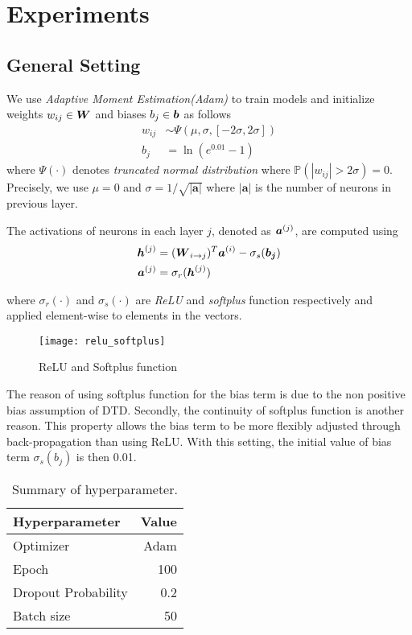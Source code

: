 \chapter{Experiments}
\label{cha:chapter4}


\section{General Setting}\label{sec:setup}
 
 We use \textit{Adaptive Moment Estimation(Adam)}\cite{KingmaAdamMethodStochastic2014} to train models and initialize weights $w_{ij} \in \patmatrix{W}$ and biases $b_{j} \in \patvector{b}$ as follows
\begin{align*}
	w_{ij} &\sim \Psi( \mu, \sigma, [-2\sigma, 2\sigma]) \\
	b_{j} &= \ln(e^{0.01} - 1)
\end{align*}
where $\Psi(\cdot)$ denotes \textit{truncated normal distribution} where $\mathbb{P}(|w_{ij}| > 2\sigma) = 0$. Precisely, we use $\mu=0$ and $\sigma = 1/\sqrt{|\boldsymbol{a}|}$ where $|\boldsymbol{a}|$ is the number of neurons in previous layer.

The activations of neurons in each layer $j$, denoted as $\patvector{a}^{(j)}$, are computed using 
\begin{align*}
\patvector{h}^{(j)}  &=  	(\patmatrix{W}_{ i \rightarrow j })^T \patvector{a}^{(i)} - \sigma_{s}(\patvector{b_j}) \\
	\patvector{a}^{(j)}  &=  	\sigma_{r} (	\patvector{h}^{(j)} )
\end{align*}

where $\sigma_r(\cdot)$ and $\sigma_s(\cdot)$ are \textit{ReLU} and \textit{softplus} function respectively and applied element-wise to elements in the vectors.

 \begin{figure}[!hbt]
\centering
\texttt{[image: relu\_softplus]}
\caption{ReLU and Softplus function} 
\label{fig:relu_softplus}
\end{figure}


The reason of using softplus function for the bias term is due to the non positive bias assumption of DTD. Secondly, the continuity of softplus function is another reason. This property allows the bias term to be more flexibly adjusted through back-propagation than using ReLU. With this setting, the initial value of bias term  $\sigma_{s}(b_j)$ is then 0.01.


\begin{table}[!htb]
\centering
\begin{tabular}{l|r}
\textbf{Hyperparameter} & \multicolumn{1}{l}{\textbf{Value}} \\ \hline
Optimizer               & Adam                               \\
Epoch     & 100                                \\
Dropout Probability     & 0.2                               \\
Batch size              & 50                                
\end{tabular}
\caption{Summary of hyperparameter.}
\label{tab:hyper_summary}
\end{table}


